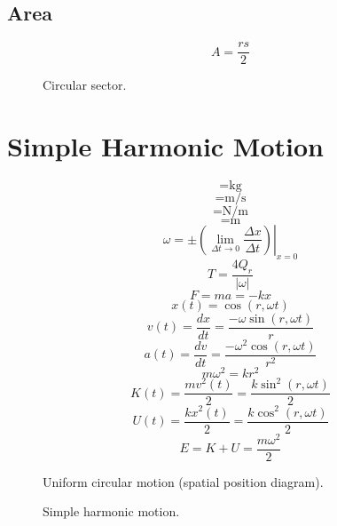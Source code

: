 \documentclass[a4paper,12pt]{report}
\begin{document}
\subsection{Area}
\begin{equation}
A = \frac{rs}{2}
\end{equation}
\clearpage
\begin{figure}[p]
\centering
\resizebox{\textwidth}{!}{}
\caption{Circular sector.}
\end{figure}
\clearpage
\section{Simple Harmonic Motion}
\begin{equation}
[m] = \text{kg}
\end{equation}
\begin{equation}
[\omega] = \text{m/s}
\end{equation}
\begin{equation}
[k] = \text{N/m}
\end{equation}
\begin{equation}
[r] = \text{m}
\end{equation}
\begin{equation}
\omega = \left.\pm \left(\lim_{\Delta t \to 0} \frac{\Delta x}{\Delta t}\right)\right|_{x=0}
\end{equation}
\begin{equation}
T = \frac{4Q_r}{|\omega|}
\end{equation}
\begin{equation}
F = ma = -kx
\end{equation}
\begin{equation}
x(t) = \cos(r,\omega t)
\end{equation}
\begin{equation}
v(t) = \frac{dx}{dt} = \frac{-\omega \sin(r,\omega t)}{r}
\end{equation}
\begin{equation}
a(t) = \frac{dv}{dt} = \frac{-\omega^2 \cos(r,\omega t)}{r^2}
\end{equation}
\begin{equation}
m \omega^2 = kr^2
\end{equation}
\begin{equation}
K(t) = \frac{mv^2(t)}{2} = \frac{k \sin^2(r,\omega t)}{2}
\end{equation}
\begin{equation}
U(t) = \frac{kx^2(t)}{2} = \frac{k \cos^2(r,\omega t)}{2}
\end{equation}
\begin{equation}
E = K + U = \frac{m \omega^2}{2}
\end{equation}
\clearpage
\begin{figure}[p]
\centering
\resizebox{\textwidth}{!}{}
\caption{Uniform circular motion (spatial position diagram).}
\end{figure}
\clearpage
\begin{figure}[p]
\centering
\resizebox{\textwidth}{!}{}
\caption{Simple harmonic motion.}
\end{figure}
\clearpage
\end{document}
